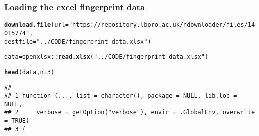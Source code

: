 \documentclass[aspectratio=169]{beamer}\usepackage[]{graphicx}\usepackage[]{xcolor}
\makeatletter
\newcommand{\hlnum}[1]{\textcolor[rgb]{0.686,0.059,0.569}{#1}}%
\newcommand{\hlsng}[1]{\textcolor[rgb]{0.192,0.494,0.8}{#1}}%
\newcommand{\hlopt}[1]{\textcolor[rgb]{0,0,0}{#1}}%
\newcommand{\hldef}[1]{\textcolor[rgb]{0.345,0.345,0.345}{#1}}%
\newcommand{\hlkwb}[1]{\textcolor[rgb]{0.69,0.353,0.396}{#1}}%
\newcommand{\hlkwc}[1]{\textcolor[rgb]{0.333,0.667,0.333}{#1}}%
\newcommand{\hlkwd}[1]{\textcolor[rgb]{0.737,0.353,0.396}{\textbf{#1}}}%
\newenvironment{kframe}{%
 \def\at@end@of@kframe{}%
 \ifinner\ifhmode%
  \def\at@end@of@kframe{\end{minipage}}%
  \begin{minipage}{\columnwidth}%
 \fi\fi%
 \def\FrameCommand##1{\hskip\@totalleftmargin \hskip-\fboxsep
 \colorbox{shadecolor}{##1}\hskip-\fboxsep
     \hskip-\linewidth \hskip-\@totalleftmargin \hskip\columnwidth}%
 \MakeFramed {\advance\hsize-\width
   \@totalleftmargin\z@ \linewidth\hsize
   \@setminipage}}%
 {\par\unskip\endMakeFramed%
 \at@end@of@kframe}
\newenvironment{knitrout}{}{} %
\makeatother
\begin{document}
\begin{frame}[fragile]\frametitle{Loading the excel fingerprint data}
\begin{knitrout}
\color{fgcolor}\begin{kframe}
\begin{alltt}
\hlkwd{download.file}\hldef{(}\hlkwc{url} \hldef{=} \hlsng{"https://repository.lboro.ac.uk/ndownloader/files/14015774"}\hldef{,}
             \hlkwc{destfile} \hldef{=} \hlsng{"../CODE/fingerprint_data.xlsx"}\hldef{)}
\end{alltt}


{\ttfamily\noindent\bfseries{}}\begin{alltt}
\hldef{data} \hlkwb{=} \hldef{openxlsx}\hlopt{::}\hlkwd{read.xlsx}\hldef{(}\hlsng{"../CODE/fingerprint_data.xlsx"}\hldef{)}
\end{alltt}


{\ttfamily\noindent\bfseries{}}\begin{alltt}
\hlkwd{head}\hldef{(data,} \hlkwc{n}\hldef{=}\hlnum{3}\hldef{)}
\end{alltt}
\begin{verbatim}
##                                                                             
## 1 function (..., list = character(), package = NULL, lib.loc = NULL,        
## 2     verbose = getOption("verbose"), envir = .GlobalEnv, overwrite = TRUE) 
## 3 {
\end{verbatim}
\end{kframe}
\end{knitrout}
\end{frame}
\end{document}
